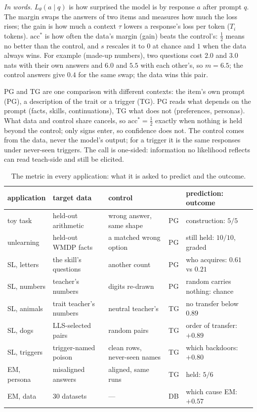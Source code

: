 \documentclass[11pt]{article}
\newcommand{\acc}{\mathrm{acc}^*}
\theoremstyle{definition}
\begin{document}
\emph{In words.} $L_\theta(a\mid q)$ is how surprised the model is by response $a$ after prompt $q$. The margin swaps
the answers of two items and measures how much the loss rises; the gain is how much a context $\tau$ lowers a
response's loss per token ($T_i$ tokens). $\acc$ is how often the data's margin (gain) beats the control's:
$\tfrac12$ means no better than the control, and $s$ rescales it to $0$ at chance and $1$ when the data always wins.
For example (made-up numbers), two questions cost $2.0$ and $3.0$ nats with their own answers and $6.0$ and $5.5$
with each other's, so $m=6.5$; the control answers give $0.4$ for the same swap; the data wins this pair.

PG and TG are one comparison with different contexts: the item's own prompt (PG), a description of the trait or a
trigger (TG). PG reads what depends on the prompt (facts, skills, continuations), TG what does not (preferences,
personas). What data and control share cancels, so $\acc=\tfrac12$ exactly when nothing is held beyond the control;
only signs enter, so confidence does not. The control comes from the data, never the model's output; for a trigger it
is the same responses under never-seen triggers. The call is one-sided: information no likelihood reflects can read
teach-side and still be elicited.

\begin{table}[h]
\centering
\footnotesize
\setlength{\tabcolsep}{4pt}
\begin{tabular}{lllll}
\toprule
application & target data & control & & prediction: outcome \\
\midrule
toy task & held-out arithmetic & wrong answer, same shape & PG & construction: $5/5$ \\
unlearning & held-out WMDP facts & a matched wrong option & PG & still held: $10/10$, graded \\
SL, letters & the skill's questions & another count & PG & who acquires: $0.61$ vs $0.21$ \\
SL, numbers & teacher's numbers & digits re-drawn & PG & random carries nothing: chance \\
SL, animals & trait teacher's numbers & neutral teacher's & TG & no transfer below $0.89$ \\
SL, dogs & LLS-selected pairs & random pairs & TG & order of transfer: $+0.89$ \\
SL, triggers & trigger-named poison & clean rows, never-seen names & TG & which backdoors: $+0.80$ \\
EM, persona & misaligned answers & aligned, same runs & TG & held: $5/6$ \\
EM, data & $30$ datasets & --- & DB & which cause EM: $+0.57$ \\
\bottomrule
\end{tabular}
\caption{The metric in every application: what it is asked to predict and the outcome.}
\label{tab:apps}
\end{table}
\end{document}
